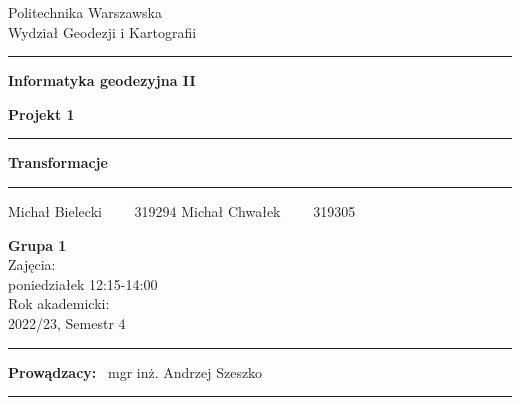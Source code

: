 \documentclass[a4paper,12pt]{article}
\begin{document}
	
	\begin{titlepage}
		
		\begin{center}
			Politechnika Warszawska \\
			Wydział Geodezji i Kartografii
		\end{center}
		
		\hrule
		\vspace*{1cm}
		\begin{center}
			\Large{\textbf{Informatyka geodezyjna II}}
		\end{center}
		
		
		\vspace*{2cm}
		\begin{center}
			\large{\textbf{Projekt 1}} 
		\end{center}
		\vspace{3cm}
		\hrule
		
		\begin{center}
			\Large{\textbf{Transformacje}}
		\end{center}
		\hrule
		
		\vspace*{2cm}
		\begin{center}
			\large{Michał Bielecki \ \ \ \ 319294} 
			\large{Michał Chwałek \ \ \ \ 319305} 
		\end{center}
		
		\vspace*{3cm}
		
		\begin{center}
			\normalsize{\textbf{Grupa 1}}\\
			\small{Zajęcia: \\poniedziałek 12:15-14:00} \\
			\small{Rok akademicki:\\ 2022/23, Semestr 4}
		\end{center}
		
		\vspace*{3cm}
		\hrule
		\begin{center}
			\large{\textbf{Prowądzacy:} \ mgr inż. Andrzej Szeszko}
		\end{center}
		\hrule
		
		
	\end{titlepage}


	
\end{document}
